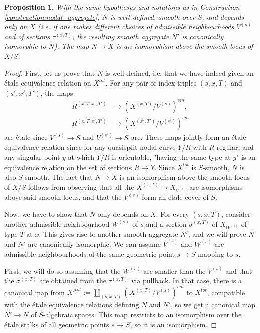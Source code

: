 \documentclass[a4paper,10pt,twoside]{article}
\newtheorem{prop}[thm]{Proposition}
\theoremstyle{definition}
\theoremstyle{remark}
\begin{document}
\begin{prop}\label{proposition:nodal_aggregates_well_def}
With the same hypotheses and notations as in Construction \ref{construction:nodal_aggregate}, $N$ is well-defined, smooth over $S$, and depends only on $X$ (i.e. if one makes different choices of admissible neighbourhoods $V^{(s)}$ and of sections $\tau^{(x,T)}$, the resulting smooth aggregate $N'$ is canonically isomorphic to $N$). The map $N\to X$ is an isomorphism above the smooth locus of $X/S$.
\end{prop}

\begin{proof}
First, let us prove that $N$ is well-defined, i.e. that we have indeed given an \'etale equivalence relation on $X^{tot}$. For any pair of index triples $(s,x,T)$ and $(s',x',T')$, the maps
\begin{align*}
R^{(x,T,x',T')}&\to (X^{(x,T)}/V^{(s)})^{sm},\\
R^{(x,T,x',T')}&\to (X^{(x',T')}/V^{(s')})^{sm}
\end{align*}
are \'etale since $V^{(s)}\to S$ and $V^{(s')}\to S$ are. These maps jointly form an \'etale equivalence relation since for any quasisplit nodal curve $Y/R$ with $R$ regular, and any singular point $y$ at which $Y/R$ is orientable, "having the same type at $y$" is an equivalence relation on the set of sections $R \to Y$. Since $X^{tot}$ is $S$-smooth, $N$ is also $S$-smooth. The fact that $N\to X$ is an isomorphism above the smooth locus of $X/S$ follows from observing that all the $X^{(x,T)}\to X_{V^{(s)}}$ are isomorphisms above said smooth locus, and that the $V^{(s)}$ form an \'etale cover of $S$.

Now, we have to show that $N$ only depends on $X$. For every $(s,x,T)$, consider another admissible neighbourhood $W^{(s)}$ of $s$ and a section $\sigma^{(x,T)}$ of $X_{W^{(s)}}$ of type $T$ at $x$. This gives rise to another smooth aggregate $N'$, and we will prove $N$ and $N'$ are canonically isomorphic. We can assume $V^{(s)}$ and $W^{(s)}$ are admissible neighbourhoods of the same geometric point $\bar s \to S$ mapping to $s$.

First, we will do so assuming that the $W^{(s)}$ are smaller than the $V^{(s)}$ and that the $\sigma^{(x,T)}$ are obtained from the $\tau^{(x,T)}$ via pullback. In that case, there is a canonical map from $X'^{tot}:=\coprod\limits_{(s,x,T)} (X^{(x,T)}/V^{(s)})^{sm}$ to $X^{tot}$, compatible with the \'etale equivalence relations defining $N$ and $N'$, so we get a canonical map $N'\to N$ of $S$-algebraic spaces. This map restricts to an isomorphism over the \'etale stalks of all geometric points $\bar s\to S$, so it is an isomorphism.


\end{proof}
\end{document}
